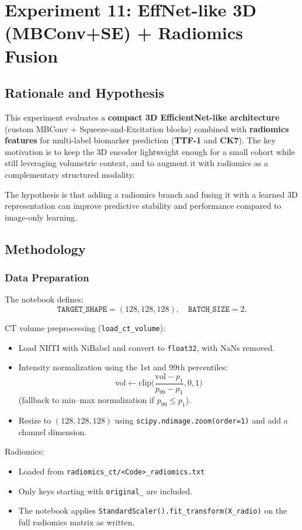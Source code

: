 \section{Experiment 11: EffNet-like 3D (MBConv+SE) + Radiomics Fusion}

\subsection{Rationale and Hypothesis}
This experiment evaluates a \textbf{compact 3D EfficientNet-like architecture} (custom MBConv + Squeeze-and-Excitation blocks) combined with \textbf{radiomics features} for multi-label biomarker prediction (\textbf{TTF-1} and \textbf{CK7}). The key motivation is to keep the 3D encoder lightweight enough for a small cohort while still leveraging volumetric context, and to augment it with radiomics as a complementary structured modality.

The hypothesis is that adding a radiomics branch and fusing it with a learned 3D representation can improve predictive stability and performance compared to image-only learning.

\subsection{Methodology}

\subsubsection{Data Preparation}
The notebook defines:
\[
\texttt{TARGET\_SHAPE} = (128,128,128), \quad \texttt{BATCH\_SIZE}=2.
\]

CT volume preprocessing (\texttt{load\_ct\_volume}):
\begin{itemize}
    \item Load NIfTI with NiBabel and convert to \texttt{float32}, with NaNs removed.
    \item Intensity normalization using the 1st and 99th percentiles:
    \[
    \text{vol} \leftarrow \text{clip}\Big(\frac{\text{vol}-p_1}{p_{99}-p_1}, 0, 1\Big)
    \]
    (fallback to min--max normalization if $p_{99}\le p_1$).
    \item Resize to $(128,128,128)$ using \texttt{scipy.ndimage.zoom(order=1)} and add a channel dimension.
\end{itemize}

Radiomics:
\begin{itemize}
    \item Loaded from \texttt{radiomics\_ct/<Code>\_radiomics.txt}
    \item Only keys starting with \texttt{original\_} are included.
    \item The notebook applies \texttt{StandardScaler().fit\_transform(X\_radio)} on the full radiomics matrix as written.
\end{itemize}

